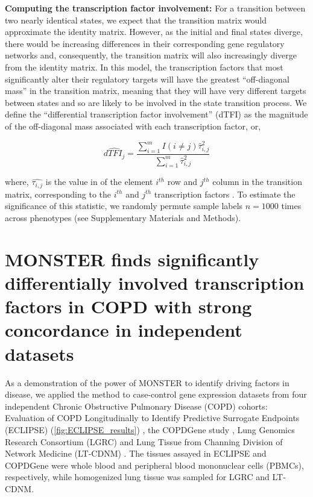 \documentclass[9pt,twocolumn,twoside]{pnas-new}
\begin{document}
\textbf{Computing the transcription factor involvement: }For a transition
between two nearly identical states, we expect that the transition
matrix would approximate the identity matrix. However, as the initial
and final states diverge, there would be increasing differences in
their corresponding gene regulatory networks and, consequently, the
transition matrix will also increasingly diverge from the identity
matrix. In this model, the transcription factors that most significantly
alter their regulatory targets will have the greatest \textquotedblleft off-diagonal
mass\textquotedblright{} in the transition matrix, meaning that they
will have very different targets between states and so are likely
to be involved in the state transition process. We define the \textquotedblleft differential
transcription factor involvement\textquotedblright{} (dTFI) as the
magnitude of the off-diagonal mass associated with each transcription
factor, or, 

\begin{equation}
\hat{dTFI_{j}}=\frac{\sum_{i=1}^{m}I\left(i\ne j\right)\hat{\tau}_{i,j}^{2}}{\sum_{i=1}^{m}\hat{\tau}_{i,j}^{2}}\label{eq:dTFI}
\end{equation}

where, $\hat{\tau_{i,j}}$ is the value in of the element $i^{th}$
row and $j^{th}$ column in the transition matrix, corresponding to
the $i^{th}$ and $j^{th}$ transcription factors . To estimate the
significance of this statistic, we randomly permute sample labels
$n=1000$ times across phenotypes (see Supplementary Materials and
Methods).

\section*{MONSTER finds significantly differentially involved transcription
factors in COPD with strong concordance in independent datasets}

As a demonstration of the power of MONSTER to identify driving factors
in disease, we applied the method to case-control gene expression
datasets from four independent Chronic Obstructive Pulmonary Disease
(COPD) cohorts: Evaluation of COPD Longitudinally to Identify Predictive
Surrogate Endpoints (ECLIPSE) \cite{singh2014altered}\cite{vestbo2008evaluation}
(\ref{fig:ECLIPSE_results}) , the COPDGene study \cite{regan2011genetic}\cite{bahr2013peripheral}
\cite{pillai2009genome}, Lung Genomics Research Consortium (LGRC)
\cite{lgrc} and Lung Tissue from Channing Division of Network Medicine
(LT-CDNM) \cite{qiu2015network}. The tissues assayed in ECLIPSE and
COPDGene were whole blood and peripheral blood mononuclear cells (PBMCs),
respectively, while homogenized lung tissue was sampled for LGRC and
LT-CDNM. 
\end{document}
